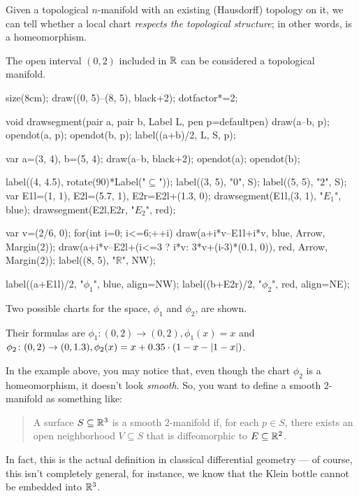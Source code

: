 Given a topological $n$-manifold with an existing (Hausdorff) topology on it, we can tell whether a
local chart \emph{respects the topological structure}; in other words, is a homeomorphism.
\begin{example}
	The open interval $(0, 2)$ included in $\mathbb R$ can be considered a topological manifold.
	\begin{center}
		\begin{asy}
			size(8cm);
			draw((0, 5)--(8, 5), black+2);
			dotfactor*=2;

			void drawsegment(pair a, pair b, Label L, pen p=defaultpen){
				draw(a--b, p); opendot(a, p); opendot(b, p);
				label((a+b)/2, L, S, p);
			}

			var a=(3, 4), b=(5, 4);
			draw(a--b, black+2); opendot(a); opendot(b);

			label((4, 4.5), rotate(90)*Label("$\subseteq$"));
			label((3, 5), "$0$", S);
			label((5, 5), "$2$", S);
			var E1l=(1, 1), E2l=(5.7, 1), E2r=E2l+(1.3, 0);
			drawsegment(E1l,(3, 1), "$E_1$", blue);
			drawsegment(E2l,E2r, "$E_2$", red);

			var v=(2/6, 0);
			for(int i=0; i<=6;++i){
				draw(a+i*v--E1l+i*v, blue, Arrow, Margin(2));
				draw(a+i*v--E2l+(i<=3 ? i*v: 3*v+(i-3)*(0.1, 0)), red, Arrow, Margin(2));
			}
			label((8, 5), "$\mathbb{R}$", NW);

			label((a+E1l)/2, "$\phi_1$", blue, align=NW);
			label((b+E2r)/2, "$\phi_2$", red, align=NE);
		\end{asy}
	\end{center}
	Two possible charts for the space, $\phi_1$ and $\phi_2$, are shown.

	Their formulas are $\phi_1 \colon (0, 2) \to (0, 2), \phi_1(x) = x$ and $\phi_2 \colon (0, 2)
	\to (0, 1.3), \phi_2(x) = x + 0.35 \cdot (1-x-\left\lvert 1-x \right\rvert)$.
\end{example}

In the example above, you may notice that, even though the chart $\phi_2$ is a homeomorphism,
it doesn't look \emph{smooth}. So, you want to define a smooth $2$-manifold as something like:
\begin{quote}
	A surface $S \subseteq \mathbb R^3$ is a smooth $2$-manifold if, for each $p \in S$, there exists an
	open neighborhood $V \subseteq S$ that is diffeomorphic to $E \subseteq \mathbb R^2$.
\end{quote}
In fact, this is the actual definition in classical differential geometry --- of course, this isn't
completely general, for instance, we know that the Klein bottle cannot be embedded into $\mathbb R^3$.

